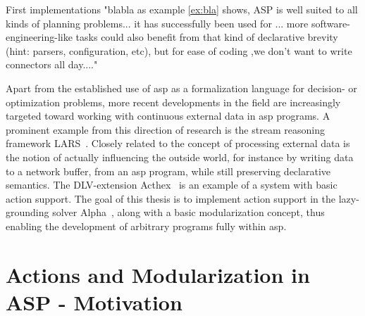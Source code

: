 First implementations 
"blabla as example \ref{ex:bla} shows, ASP is well suited to all kinds of planning problems... it has successfully been used for ... more software-engineering-like tasks could also benefit from that kind of declarative brevity (hint: parsers, configuration, etc), but for ease of coding ,we don't want to write connectors all day...."

Apart from the established use of \gls{asp} as a formalization language for decision- or optimization problems, more recent developments in the field are increasingly targeted toward working with continuous external data in \gls{asp} programs. A prominent example from this direction of research is the stream reasoning framework LARS~\cite{lars}. Closely related to the concept of processing external data is the notion of actually influencing the outside world, for instance by writing data to a network buffer, from an \gls{asp} program, while still preserving declarative semantics. The DLV-extension Acthex~\cite{acthex} is an example of a system with basic action support. The goal of this thesis is to implement action support in the lazy-grounding solver Alpha~\cite{alpha}, along with a basic modularization concept, thus enabling the development of arbitrary programs fully within \gls{asp}.

\section{Actions and Modularization in ASP - Motivation}

